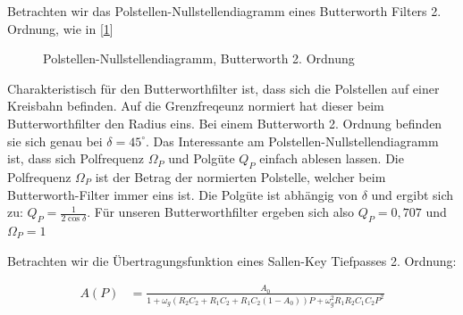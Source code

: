 Betrachten wir das Polstellen-Nullstellendiagramm eines Butterworth Filters 2. Ordnung, wie in [\cref{fig:filter_polnul}]


\begin{figure}[H]
\centering
{}
\caption{Polstellen-Nullstellendiagramm, Butterworth 2. Ordnung}
\label{fig:filter_polnul}
\end{figure}



Charakteristisch für den Butterworthfilter ist, dass sich die Polstellen auf einer Kreisbahn befinden. Auf die Grenzfreqeunz normiert hat dieser beim Butterworthfilter den Radius
eins. Bei einem Butterworth 2. Ordnung befinden sie sich genau bei $\delta=45^\circ$. Das Interessante am Polstellen-Nullstellendiagramm ist, dass sich Polfrequenz $\Omega_P$ und 
Polgüte $Q_P$ einfach ablesen lassen. Die Polfrequenz $\Omega_P$ ist der Betrag der normierten Polstelle, welcher beim Butterworth-Filter immer eins ist.
Die Polgüte ist abhängig von $\delta$ und ergibt sich zu: $Q_P=\frac{1}{2\cos{\delta}}$. Für unseren Butterworthfilter ergeben sich also $Q_P=0,707$ und $\Omega_P=1$


Betrachten wir die Übertragungsfunktion eines Sallen-Key Tiefpasses 2. Ordnung:

\begin{align*}
A(P)&=\frac{A_0}{1+\omega_g (R_2 C_2 + R_1 C_2 + R_1 C_2(1-A_0))P + \omega_g^2R_1 R_2 C_1C_2P^2}
\end{align*}


